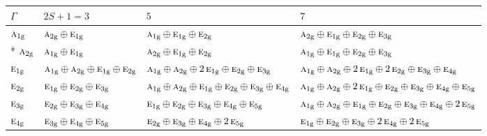 \documentclass[10pt,a4paper]{article}
\numberwithin{equation}{section}
\newcommand{\irr}[1]{\text{\normalfont\scshape #1}}
\newcommand{\ptag}[1]{\mathrm{#1}}
\begin{document}
{\small\setlength{\tabcolsep}{3pt}\begin{longtable}{@{}l>{\RaggedRight\arraybackslash}p{}>{\RaggedRight\arraybackslash}p{}>{\RaggedRight\arraybackslash}p{}@{}}\toprule
$\Gamma$ & $2S + 1 = 3$ & $5$ & $7$\\\midrule\endhead
\bottomrule\endfoot\endlastfoot
$\irr{a}_{1\ptag{g}}$ & $\irr{a}_{2\ptag{g}}\oplus \irr{e}_{1\ptag{g}}$ & $\irr{a}_{1\ptag{g}}\oplus \irr{e}_{1\ptag{g}}\oplus \irr{e}_{2\ptag{g}}$ & $\irr{a}_{2\ptag{g}}\oplus \irr{e}_{1\ptag{g}}\oplus \irr{e}_{2\ptag{g}}\oplus \irr{e}_{3\ptag{g}}$\\*
$\irr{a}_{2\ptag{g}}$ & $\irr{a}_{1\ptag{g}}\oplus \irr{e}_{1\ptag{g}}$ & $\irr{a}_{2\ptag{g}}\oplus \irr{e}_{1\ptag{g}}\oplus \irr{e}_{2\ptag{g}}$ & $\irr{a}_{1\ptag{g}}\oplus \irr{e}_{1\ptag{g}}\oplus \irr{e}_{2\ptag{g}}\oplus \irr{e}_{3\ptag{g}}$\\
$\irr{e}_{1\ptag{g}}$ & $\irr{a}_{1\ptag{g}}\oplus \irr{a}_{2\ptag{g}}\oplus \irr{e}_{1\ptag{g}}\oplus \irr{e}_{2\ptag{g}}$ & $\irr{a}_{1\ptag{g}}\oplus \irr{a}_{2\ptag{g}}\oplus 2\,\irr{e}_{1\ptag{g}}\oplus \irr{e}_{2\ptag{g}}\oplus \irr{e}_{3\ptag{g}}$ & $\irr{a}_{1\ptag{g}}\oplus \irr{a}_{2\ptag{g}}\oplus 2\,\irr{e}_{1\ptag{g}}\oplus 2\,\irr{e}_{2\ptag{g}}\oplus \irr{e}_{3\ptag{g}}\oplus \irr{e}_{4\ptag{g}}$\\
$\irr{e}_{2\ptag{g}}$ & $\irr{e}_{1\ptag{g}}\oplus \irr{e}_{2\ptag{g}}\oplus \irr{e}_{3\ptag{g}}$ & $\irr{a}_{1\ptag{g}}\oplus \irr{a}_{2\ptag{g}}\oplus \irr{e}_{1\ptag{g}}\oplus \irr{e}_{2\ptag{g}}\oplus \irr{e}_{3\ptag{g}}\oplus \irr{e}_{4\ptag{g}}$ & $\irr{a}_{1\ptag{g}}\oplus \irr{a}_{2\ptag{g}}\oplus 2\,\irr{e}_{1\ptag{g}}\oplus \irr{e}_{2\ptag{g}}\oplus \irr{e}_{3\ptag{g}}\oplus \irr{e}_{4\ptag{g}}\oplus \irr{e}_{5\ptag{g}}$\\
$\irr{e}_{3\ptag{g}}$ & $\irr{e}_{2\ptag{g}}\oplus \irr{e}_{3\ptag{g}}\oplus \irr{e}_{4\ptag{g}}$ & $\irr{e}_{1\ptag{g}}\oplus \irr{e}_{2\ptag{g}}\oplus \irr{e}_{3\ptag{g}}\oplus \irr{e}_{4\ptag{g}}\oplus \irr{e}_{5\ptag{g}}$ & $\irr{a}_{1\ptag{g}}\oplus \irr{a}_{2\ptag{g}}\oplus \irr{e}_{1\ptag{g}}\oplus \irr{e}_{2\ptag{g}}\oplus \irr{e}_{3\ptag{g}}\oplus \irr{e}_{4\ptag{g}}\oplus 2\,\irr{e}_{5\ptag{g}}$\\
$\irr{e}_{4\ptag{g}}$ & $\irr{e}_{3\ptag{g}}\oplus \irr{e}_{4\ptag{g}}\oplus \irr{e}_{5\ptag{g}}$ & $\irr{e}_{2\ptag{g}}\oplus \irr{e}_{3\ptag{g}}\oplus \irr{e}_{4\ptag{g}}\oplus 2\,\irr{e}_{5\ptag{g}}$ & $\irr{e}_{1\ptag{g}}\oplus \irr{e}_{2\ptag{g}}\oplus \irr{e}_{3\ptag{g}}\oplus 2\,\irr{e}_{4\ptag{g}}\oplus 2\,\irr{e}_{5\ptag{g}}$\\

\end{longtable}}
\end{document}
